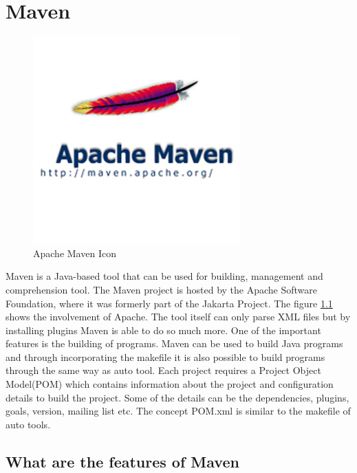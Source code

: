 \chapter{Maven}
\begin{figure}
 \vspace{-20pt}
  \begin{centering}
  \includegraphics[scale=0.5]{apache-maven.jpg}
  \end{centering}
  \vspace{-40pt}
  \caption{Apache Maven Icon\protect\footnotemark}
  \label{fig:maven1}
\end{figure}

Maven\cite{maven-website} is a Java-based tool that can be used for building, management and comprehension tool. The Maven project is hosted by the Apache Software Foundation, where it was formerly part of the Jakarta Project. The figure \ref{fig:maven1} shows the involvement of Apache. The tool itself can only parse XML files but by installing plugins Maven is able to do so much more. One of the important features is the building of programs. Maven can be used to build Java programs and through incorporating the makefile it is also possible to build programs through the same way as auto tool. Each project requires a Project Object Model(POM) which contains information about the project and configuration details to build the project. Some of the details can be the dependencies, plugins, goals, version, mailing list etc. The concept POM.xml is similar to the makefile of auto tools.

\section{What are the features of Maven}

